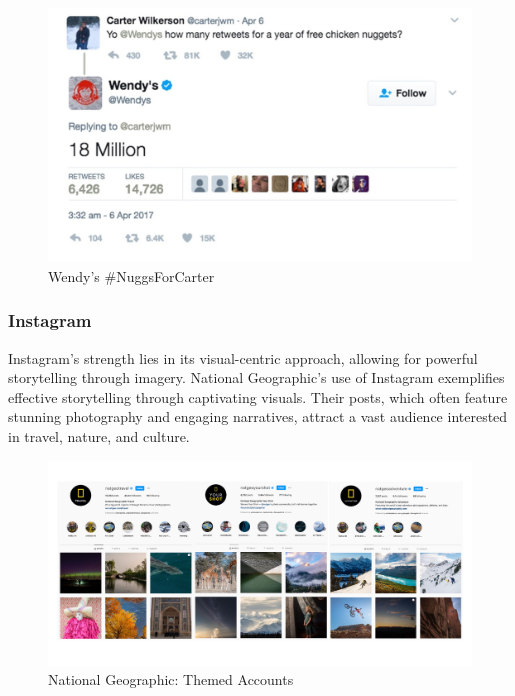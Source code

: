 \documentclass[
]{book}
\begin{document}
\begin{figure}
\centering
\includegraphics[width=1\textwidth,height=\textheight]{images/wendys.jpg}
\caption{Wendy's \#NuggsForCarter}
\end{figure}

\hypertarget{instagram}{%
\subsubsection*{Instagram}\label{instagram}}

Instagram's strength lies in its visual-centric approach, allowing for powerful storytelling through imagery. National Geographic's use of Instagram exemplifies effective storytelling through captivating visuals. Their posts, which often feature stunning photography and engaging narratives, attract a vast audience interested in travel, nature, and culture.

\begin{figure}
\centering
\includegraphics[width=1\textwidth,height=\textheight]{images/natgeo.png}
\caption{National Geographic: Themed Accounts}
\end{figure}
\end{document}
